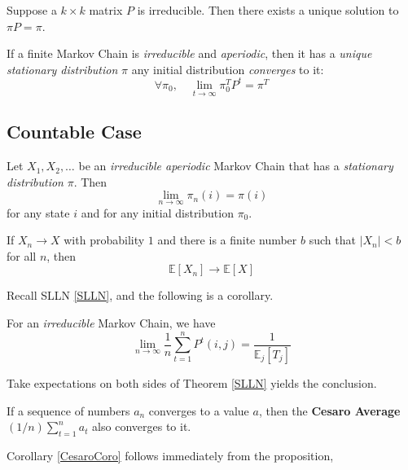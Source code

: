    \begin{lemma}
        Suppose a $k \times k$ matrix $P$ is irreducible. Then there exists a unique solution to $\pi P = \pi$.
    \end{lemma}
    \begin{theorem} If a finite Markov Chain is \emph{irreducible} and \emph{aperiodic}, then it has a \emph{unique stationary distribution} $\pi$ any initial distribution \emph{converges} to it:
        \[ \forall \pi_0,\quad \lim_{t\to\infty}\pi_0^T P^t = \pi^T \]
    \end{theorem}

    \subsection{Countable Case}
    \begin{theorem}
        Let $X_1, X_2, \dots$ be an \emph{irreducible aperiodic} Markov Chain that has a \emph{stationary distribution} $\pi$. Then
        \[ \lim_{n\to\infty}\pi_n(i) = \pi(i) \]
        for any state $i$ and for any initial distribution $\pi_0$.
    \end{theorem}
    \begin{lemma}\label{BCT}
        If $X_n \to X$ with probability $1$ and there is a finite number $b$ such that $|X_n| < b$ for all $n$, then
        \[ \mathbb{E}[X_n] \to \mathbb{E}[X] \]
    \end{lemma}
    Recall SLLN \ref{SLLN}, and the following is a corollary.
    \begin{corollary}\label{SLLNCoro}
        For an \emph{irreducible} Markov Chain, we have
        \[ \lim_{n\to\infty} \frac{1}{n}\sum_{t=1}^n P^t(i,j) = \frac{1}{\mathbb{E}_j[T_j]} \]
    \end{corollary}
    \begin{sketchproof}
        Take expectations on both sides of Theorem \ref{SLLN} yields the conclusion.
    \end{sketchproof}
    \begin{proposition}
        If a sequence of numbers $a_n$ converges to a value $a$, then the \textbf{Cesaro Average} $(1/n)\sum_{t=1}^na_t$ also converges to it.
    \end{proposition}
    Corollary \ref{CesaroCoro} follows immediately from the proposition,
